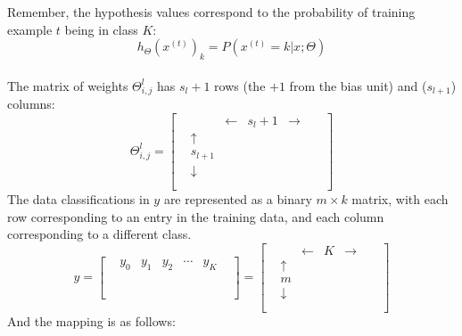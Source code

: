 \documentclass[12pt]{article}
\begin{document}
Remember, the hypothesis values correspond to the probability of training example $t$ being in class $K$:
\begin{equation}
h_{\Theta}(x^{(t)})_k=P(x^{(t)}=k|x;\Theta)
\end{equation}
\\
The matrix of weights $\Theta^{l}_{i,j}$ has $s_l+1$ rows (the $+1$ from the bias unit) and ($s_{l+1}$) columns:
\begin{equation}
\Theta^{l}_{i,j}=\begin{bmatrix}
& & \leftarrow & s_{l}+1 & \rightarrow & &\\
& \uparrow & & & & & \\
& s_{l+1} & & & & & \\
& \downarrow & & & & & \\
& & & & & & \\
\end{bmatrix}
\end{equation}
The data classifications in $y$ are represented as a binary $m \times k$ matrix, with each row corresponding to an entry in the training data, and each column corresponding to a different class.
\begin{equation}
y=\begin{bmatrix}
& y_0 & y_1 & y_2 & \cdots & y_K &\\
& & & & & & \\
& & & & & & \\
& & & & & & \\
& & & & & & \\
\end{bmatrix}=\begin{bmatrix}
& & \leftarrow & K & \rightarrow & &\\
& \uparrow & & & & & \\
& m & & & & & \\
& \downarrow & & & & & \\
& & & & & & \\
\end{bmatrix}
\end{equation}
And the mapping is as follows:
\end{document}
